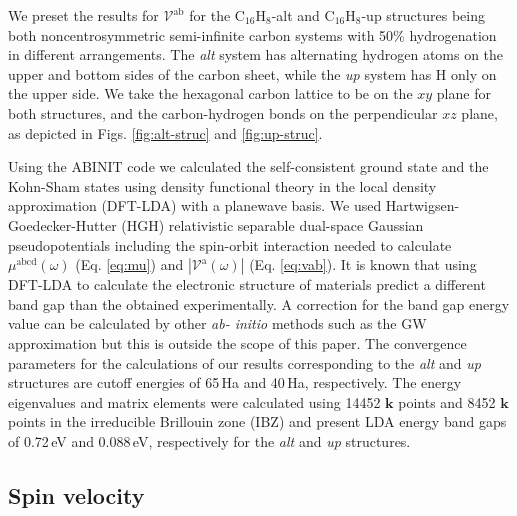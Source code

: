 \documentclass[prb,11pt,tightenlines,twocolumn,aps]{revtex4-1}
\begin{document}
We preset the results for $\mathcal{V}^{\mathrm{ab}}$ for the
C$_{16}$H$_{8}$-alt and C$_{16}$H$_{8}$-up structures being both
noncentrosymmetric semi-infinite carbon systems with 50\% hydrogenation in
different arrangements. The \emph{alt} system has alternating hydrogen atoms on
the upper and bottom sides of the carbon sheet, while the \emph{up} system has H
only on the upper side. We take the hexagonal carbon lattice to be on the $xy$
plane for both structures, and the carbon-hydrogen bonds on the perpendicular
$xz$ plane, as depicted in Figs.
\ref{fig:alt-struc} and \ref{fig:up-struc}.

Using the ABINIT code \cite{gonzeCPC09} we calculated the self-consistent ground
state and the Kohn-Sham states using density functional theory in the local
density approximation (DFT-LDA) with a planewave basis. We used Hartwigsen-
Goedecker-Hutter (HGH) relativistic separable dual-space Gaussian
pseudopotentials \cite{hartwigsenPRB98} including the spin-orbit interaction
needed to calculate $\mu^{\mathrm{abcd}}(\omega)$ (Eq.
\eqref{eq:mu}) and $|\mathcal{V}^{\mathrm{a}}(\omega)|$ (Eq. \eqref{eq:vab}).
%
It is known that using DFT-LDA to calculate the electronic structure of
materials predict a different band gap than the obtained experimentally. A
correction for the band gap energy value can be calculated by other \emph{ab-
initio} methods such as the GW approximation \cite{onidaRMP02} but this is
outside the scope of this paper.
% 
The convergence parameters for the calculations of our results corresponding to
the \emph{alt} and \emph{up} structures are cutoff energies of 65\,Ha and
40\,Ha, respectively. The energy eigenvalues and matrix elements were calculated
using 14452 $\mathbf{k}$ points and 8452 $\mathbf{k}$ points in the irreducible
Brillouin zone (IBZ) and present LDA energy band gaps of 0.72\,eV and 0.088\,eV,
respectively for the \emph{alt} and \emph{up} structures. 



\subsection{Spin velocity} %
\label{sec:res-spin_velocity}
\end{document}
